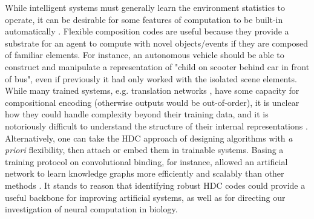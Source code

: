 \documentclass{article}
\begin{document}
While intelligent systems must generally learn the environment statistics to operate, it can be desirable for some features of computation to be built-in automatically \cite{Zador:2019}. Flexible composition codes are useful because they provide a substrate for an agent to compute with novel objects/events if they are composed of familiar elements. For instance, an autonomous vehicle should be able to construct and manipulate a representation of "child on scooter behind car in front of bus", even if previously it had only worked with the isolated scene elements. While many trained systems, e.g. translation networks \cite{Bahdanau:2014, Luong:2015, Wu:2016}, have some capacity for compositional encoding (otherwise outputs would be out-of-order), it is unclear how they could handle complexity beyond their training data, and it is notoriously difficult to understand the structure of their internal representations \cite{Zeiler:2013, Montavon:2018}. Alternatively, one can take the HDC approach of designing algorithms with \textit{a priori} flexibility, then attach or embed them in trainable systems. Basing a training protocol on convolutional binding, for instance, allowed an artificial network to learn knowledge graphs more efficiently and scalably than other methods \cite{Nickel:2015}. It stands to reason that identifying robust HDC codes could provide a useful backbone for improving artificial systems, as well as for directing our investigation of neural computation in biology.
\end{document}

